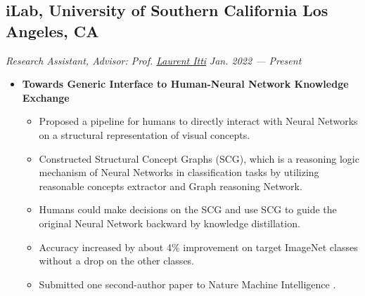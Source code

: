 \documentclass[a4,10pt]{article}
\newcommand{\subtext}[1]{
#1\par\vspace{-0.2cm}}
\newenvironment{zitemize}{
\begin{itemize}\itemsep0pt \parskip0pt \parsep1pt}
{\end{itemize}\vspace{-0.5cm}}
\begin{document}
\subsection*{iLab, University of Southern California \hfill Los Angeles, CA}
\subtext{\textit{Research Assistant, Advisor: Prof. \href{http://ilab.usc.edu/itti/} {Laurent Itti} }\hfill \textit{Jan. 2022 --- Present}}
    \begin{zitemize}
        \item \textbf{Towards Generic Interface to Human-Neural Network
Knowledge Exchange}
            \begin{itemize}
                \item Proposed a pipeline for humans to directly interact with Neural Networks on a structural representation of visual concepts.
                \item Constructed Structural Concept Graphs (SCG), which is a reasoning logic mechanism of Neural Networks in classification tasks by utilizing reasonable concepts extractor and Graph reasoning Network.
                \item Humans could make decisions on the SCG and use SCG to guide the original Neural Network backward by knowledge distillation. 
                \item Accuracy increased by about 4\% improvement on target ImageNet classes without a drop on the other classes. 
                \item Submitted one second-author paper to Nature Machine Intelligence \cite{Pap3}.
            \end{itemize}
        
        
        \end{zitemize}

\end{document}
